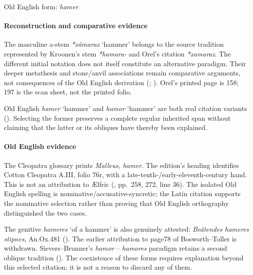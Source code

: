 \documentclass[
  british,
  a4paper,
]{article}
\providecommand{\Recon}[1]{\emph{*#1}}
\begin{document}
Old English form: \emph{hamer}

\paragraph{Reconstruction and comparative
evidence}\label{reconstruction-and-comparative-evidence-86}

The masculine a-stem \Recon{xámaraz} `hammer' belongs to the source
tradition represented by Kroonen's stem \emph{*hamara-} and Orel's
citation \emph{*xamaraz}. The different initial notation does not itself
constitute an alternative paradigm. Their deeper metathesis and
stone/anvil associations remain comparative arguments, not consequences
of the Old English derivation (; ). Orel's printed page
is 158; 197 is the scan sheet, not the printed folio.

Old English {\emph{hamer}} `hammer' and {\emph{hamor}} `hammer' are both
real citation variants (). Selecting the former preserves a complete regular inherited span
without claiming that the latter or its obliques have thereby been
explained.

\paragraph{Old English evidence}\label{old-english-evidence-88}

The Cleopatra glossary prints \emph{Malleus, hamer.} The edition's
heading identifies Cotton Cleopatra A.III, folio 76r, with a
late-tenth-/early-eleventh-century hand. This is not an attribution to
Ælfric (, pp.~258,
272, line 36). The isolated Old English spelling is
nominative/accusative-syncretic; the Latin citation supports the
nominative selection rather than proving that Old English orthography
distinguished the two cases.

The genitive {\emph{hameres}} `of a hammer' is also genuinely attested:
\emph{Beátendes hameres stipnes}, An.Ox.481
(). The earlier attribution
to page78 of Bosworth--Toller is withdrawn. Sievers--Brunner's
{\emph{hamor}} -- {\emph{hamores}} paradigm retains a second oblique
tradition ().
The coexistence of these forms requires explanation beyond this selected
citation; it is not a reason to discard any of them.
\end{document}
